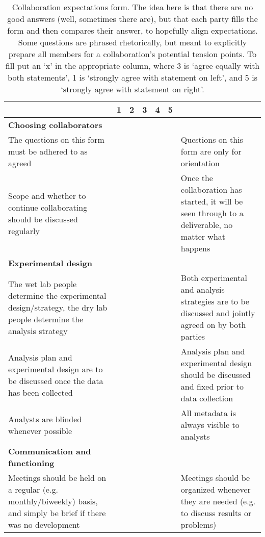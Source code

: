 
\setlength\extrarowheight{4pt}

\begin{table}[!ht]
   \caption{Collaboration expectations form. The idea here is that there are no good answers (well, sometimes there are), but that each party fills the form and then compares their answer, to hopefully align expectations. Some questions are phrased rhetorically, but meant to explicitly prepare all members for a collaboration's potential tension points. {\color{red} To fill put an `x' in the appropriate column, where 3 is `agree equally with both statements', 1 is `strongly agree with statement on left', and 5 is `strongly agree with statement on right'}.
}
    \label{form}
    \raggedleft
    \begin{adjustbox}{max width=\textwidth}
    \begin{tabular}{|p{3.1in}|l|l|l|l|l|p{3.1in}|}
    \hline
        ~ & 1 & 2 & 3 & 4 & 5 & ~ \tabularnewline \hline
        \textbf{Choosing collaborators} & ~ & ~ & ~ & ~ & ~ & ~ \tabularnewline \hline
        The questions on this form must be adhered to as agreed & ~ & ~ & ~ & ~ & ~ & Questions on this form are only for orientation \\ \hline
        Scope and whether to continue collaborating should be discussed regularly & ~ & ~ & ~ & ~ & ~ & Once the collaboration has started, it will be seen through to a deliverable, no matter what happens \\ \hline
        \textbf{Experimental design} & ~ & ~ & ~ & ~ & ~ & ~ \\ \hline
        The wet lab people determine the experimental design/strategy, the dry lab people determine the analysis strategy & ~ & ~ & ~ & ~ & ~ & Both experimental and analysis strategies are to be discussed and jointly agreed on by both parties \\ \hline
        Analysis plan and experimental design are to be discussed once the data has been collected & ~ & ~ & ~ & ~ & ~ & Analysis plan and experimental design should be discussed and fixed prior to data collection \\ \hline
        Analysts are blinded whenever possible & ~ & ~ & ~ & ~ & ~ & All metadata is always visible to analysts \\ \hline
        \textbf{Communication and functioning} & ~ & ~ & ~ & ~ & ~ & ~ \\ \hline
        Meetings should be held on a regular (e.g. monthly/biweekly) basis, and simply be brief if there was no development & ~ & ~ & ~ & ~ & ~ & Meetings should be organized whenever they are needed (e.g. to discuss results or problems) \\ \hline

\end{tabular}
\end{adjustbox}
\end{table}
